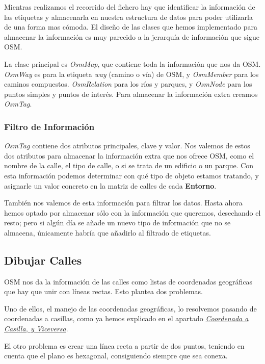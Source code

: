 Mientras realizamos el recorrido del fichero hay que identificar la información
de las etiquetas y almacenarla en nuestra estructura de datos para poder
utilizarla de una forma mas cómoda. El diseño de las clases que hemos
implementado para almacenar la información es muy parecido a la jerarquía de
información que sigue OSM.

La clase principal es {\em OsmMap}, que contiene toda la información que nos da
OSM. {\em OsmWay} es para la etiqueta {\em way} (camino o vía) de OSM, y {\em
OsmMember} para los caminos compuestos. {\em OsmRelation} para los ríos y
parques, y {\em OsmNode} para los puntos simples y puntos de interés. Para
almacenar la información extra creamos {\em OsmTag}.

\subsubsection*{Filtro de Información}

{\em OsmTag} contiene dos atributos principales, clave y valor. Nos valemos de
estos dos atributos para almacenar la información extra que nos ofrece OSM, como
el nombre de la calle, el tipo de calle, o si se trata de un edificio o un
parque. Con esta información podemos determinar con qué tipo de objeto estamos
tratando, y asignarle un valor concreto en la matriz de calles de cada {\bf
Entorno}.

También nos valemos de esta información para filtrar los datos. Hasta ahora
hemos optado por almacenar sólo con la información que queremos, desechando el
resto; pero si algún día se añade un nuevo tipo de información que no se
almacena, únicamente habría que añadirlo al filtrado de etiquetas.

\subsection*{Dibujar Calles}

OSM nos da la información de las calles como listas de coordenadas geográficas
que hay que unir con líneas rectas. Esto plantea dos problemas.

Uno de ellos, el manejo de las coordenadas geográficas, lo resolvemos pasando de
coordenadas a casillas, como ya hemos explicado en el apartado
\hyperref[coordToCasilla]{{\em Coordenada a Casilla, y Viceversa}}.

El otro problema es crear una línea recta a partir de dos puntos, teniendo en
cuenta que el plano es hexagonal, consiguiendo siempre que sea conexa.

